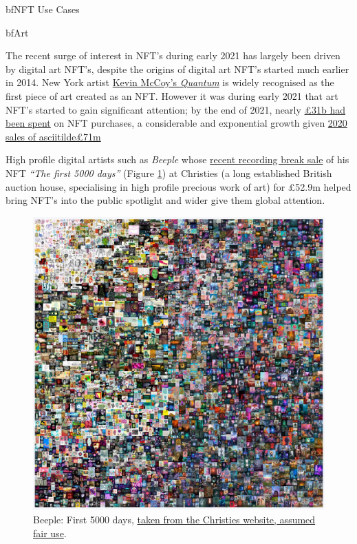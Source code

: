 bf{NFT Use Cases}

bf{Art}

The recent surge of interest in NFT's during early 2021 has largely been
driven by digital art NFT's, despite the origins of digital art NFT's
started much earlier in 2014. New York artist
\href{https://www.mccoyspace.com/project/125/}{Kevin McCoy's
\emph{Quantum}} is widely recognised as the first piece of art created
as an NFT. However it was during early 2021 that art NFT's started to
gain significant attention; by the end of 2021, nearly
\href{https://www.paymentscardsandmobile.com/state-of-the-blockchain-nfts-explode-onto-scene-in-2021/}{£31b
had been spent} on NFT purchases, a considerable and exponential growth
given
\href{https://raritysniper.com/news/nfts-exploded-in-2021-with-25-billion-in-sales/}{2020
sales of asciitilde£71m}

High profile digital artists such as \emph{Beeple} whose
\href{https://www.forbes.com/sites/abrambrown/2021/03/11/beeple-art-sells-for-693-million-becoming-most-expensive-nft-ever/?sh=3f237d1c2448}{recent
recording break sale} of his NFT \emph{``The first 5000 days''} (Figure \ref{fig:first5000days}) at Christies (a long established British auction house,
specialising in high profile precious work of art) for £52.9m helped
bring NFT's into the public spotlight and wider give them global
attention.

\begin{figure}[ht]\centering %
	\includegraphics{first5000days}
	\caption{Beeple: First 5000 days, \href{https://onlineonly.christies.com/s/beeple-first-5000-days/lots/2020}{taken from the Christies website, assumed fair use}.}
	\label{fig:first5000days}
\end{figure}

